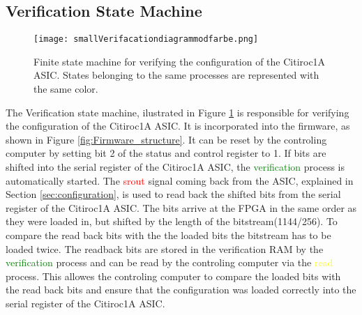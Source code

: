 \subsection{Verification State Machine}
\begin{figure}[H]
    \centering
    \texttt{[image: smallVerifacationdiagrammodfarbe.png]}%
    \caption{Finite state machine for verifying the configuration of the Citiroc1A ASIC.
    States belonging to the same processes are represented with the same color.}
    \label{fig:Verification_state_machine}
\end{figure}
The Verification state machine, ilustrated in Figure \ref{fig:Verification_state_machine} is responsible for verifying the configuration of the Citiroc1A ASIC.
It is incorporated into the firmware, as shown in Figure \ref{fig:Firmware_structure}.
\newline
It can be reset by the controling computer by setting bit 2 of the status and control register to 1.
\newline
If bits are shifted into the serial register of the Citiroc1A ASIC, the \textcolor{green}{verification} process is automatically started.
The \textcolor{red}{srout} signal coming back from the ASIC, explained in Section \ref{sec:configuration}, is used to read back the shifted bits from the serial register of the Citiroc1A ASIC.
The bits arrive at the FPGA in the same order as they were loaded in, but shifted by the length of the bitstream(1144/256). To compare the read back bits with the the loaded bits the bitstream has to be loaded twice.
\newline
The readback bits are stored in the verification RAM by the \textcolor{green}{verification} process and can be read by the controling computer via the  \textcolor{yellow}{read} process.
This allowes the controling computer to compare the loaded bits with the read back bits and ensure that the configuration was loaded correctly into the serial register of the Citiroc1A ASIC.
